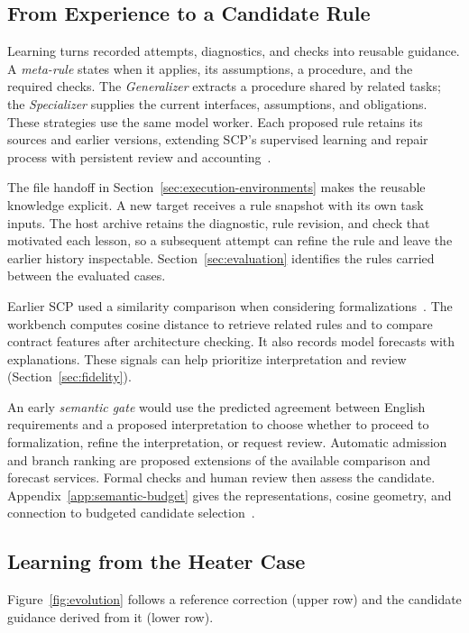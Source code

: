 



\subsection{From Experience to a Candidate Rule}
Learning turns recorded attempts, diagnostics, and checks into reusable guidance. A \emph{meta-rule} states when it applies, its assumptions, a procedure, and the required checks. The \emph{Generalizer} extracts a procedure shared by related tasks; the \emph{Specializer} supplies the current interfaces, assumptions, and obligations. These strategies use the same model worker. Each proposed rule retains its sources and earlier versions, extending SCP's supervised learning and repair process with persistent review and accounting~\cite{tahat2026scp,scpCheckpoint}.

The file handoff in Section~\ref{sec:execution-environments} makes the reusable knowledge explicit. A new target receives a rule snapshot with its own task inputs. The host archive retains the diagnostic, rule revision, and check that motivated each lesson, so a subsequent attempt can refine the rule and leave the earlier history inspectable. Section~\ref{sec:evaluation} identifies the rules carried between the evaluated cases.

Earlier SCP used a similarity comparison when considering formalizations~\cite{tahat2026scp}. The workbench computes cosine distance to retrieve related rules and to compare contract features after architecture checking. It also records model forecasts with explanations. These signals can help prioritize interpretation and review (Section~\ref{sec:fidelity}).

An early \emph{semantic gate} would use the predicted agreement between English requirements and a proposed interpretation to choose whether to proceed to formalization, refine the interpretation, or request review. Automatic admission and branch ranking are proposed extensions of the available comparison and forecast services. Formal checks and human review then assess the candidate. Appendix~\ref{app:semantic-budget} gives the representations, cosine geometry, and connection to budgeted candidate selection~\cite{foster2026rpm,tahat2026dascslides}.

\subsection{Learning from the Heater Case}
Figure~\ref{fig:evolution} follows a reference correction (upper row) and the candidate guidance derived from it (lower row).

